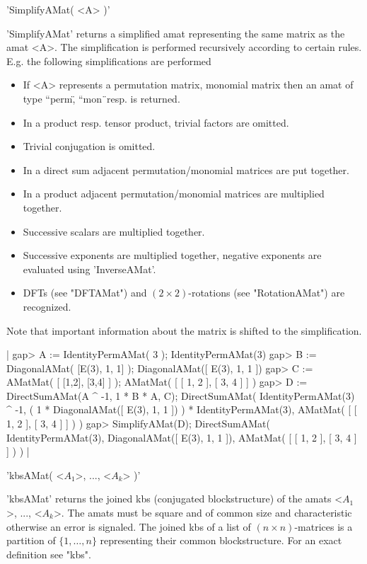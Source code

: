 
'SimplifyAMat( <A> )'

'SimplifyAMat' returns a simplified amat representing the same matrix 
as the amat <A>. The simplification is performed recursively according 
to certain rules.
E.g. the following simplifications are performed\:\ 
\begin{itemize}
\item If <A> represents a permutation matrix, monomial matrix
then an amat of type ``perm\", ``mon\"\ resp. is returned.
\item In a product resp. tensor product, trivial factors
are omitted.
\item Trivial conjugation is omitted.
\item In a direct sum adjacent permutation/monomial matrices 
are put together.
\item In a product adjacent permutation/monomial matrices 
are multiplied together.
\item Successive scalars are multiplied together.
\item Successive exponents are multiplied together, negative 
exponents are evaluated using 'InverseAMat'.
\item DFTs (see "DFTAMat") and 
$(2\times 2)$-rotations (see "RotationAMat") are recognized.
\end{itemize}
Note that important information about the matrix is 
shifted to the simplification.

|    gap> A := IdentityPermAMat( 3 );
    IdentityPermAMat(3)
    gap> B := DiagonalAMat( [E(3), 1, 1] );
    DiagonalAMat([ E(3), 1, 1 ])
    gap> C := AMatMat( [ [1,2], [3,4] ] );
    AMatMat(
      [ [ 1, 2 ], [ 3, 4 ] ]
    )
    gap> D := DirectSumAMat(A ^ -1, 1 * B * A, C);
    DirectSumAMat(
      IdentityPermAMat(3) ^ -1,
      ( 1 * DiagonalAMat([ E(3), 1, 1 ])
      ) *
      IdentityPermAMat(3),
      AMatMat(
        [ [ 1, 2 ], [ 3, 4 ] ]
      )
    )
    gap> SimplifyAMat(D);
    DirectSumAMat(
      IdentityPermAMat(3),
      DiagonalAMat([ E(3), 1, 1 ]),
      AMatMat(
        [ [ 1, 2 ], [ 3, 4 ] ]
      )
    ) |

\Section{kbsAMat}

'kbsAMat( <$A_1$>, ..., <$A_k$> )'

'kbsAMat' returns the joined kbs (conjugated blockstructure) 
of the amats <$A_1$>, ..., <$A_k$>.
The amats must be square and of common size and characteristic 
otherwise an error is signaled. The joined kbs of a list of 
$(n\times n)$-matrices is a partition of $\{1,\dots,n\}$ representing their
common blockstructure. For an exact definition see "kbs".

